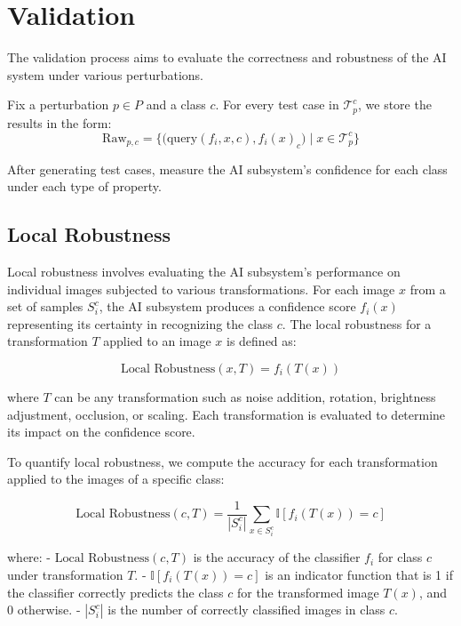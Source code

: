 \section{Validation}

The validation process aims to evaluate the correctness and robustness of the AI system under various perturbations.

Fix a perturbation \( p \in P \) and a class \( c \). For every test case in \( \mathcal{T}_p^c \), we store the results in the form:
\[ \text{Raw}_{p, c} = \Big\{\big(\text{query}(f_i, x, c), f_i(x)_c\big) \mid x \in \mathcal{T}_p^c \Big\} \]

After generating test cases, measure the AI subsystem's confidence for each class under each type of property.

\subsection{Local Robustness}

Local robustness involves evaluating the AI subsystem's performance on individual images subjected to various transformations. For each image \( x \) from a set of samples \( S_i^c \), the AI subsystem produces a confidence score \( f_i(x) \) representing its certainty in recognizing the class \( c \). The local robustness for a transformation \( T \) applied to an image \( x \) is defined as:

\[ \text{Local Robustness}(x, T) = f_i(T(x)) \]

where \( T \) can be any transformation such as noise addition, rotation, brightness adjustment, occlusion, or scaling. Each transformation is evaluated to determine its impact on the confidence score.

To quantify local robustness, we compute the accuracy for each transformation applied to the images of a specific class:

\[
\text{Local Robustness}(c, T) = \frac{1}{|S_i^c|} \sum_{x \in S_i^c} \mathbb{I}[f_i(T(x)) = c]
\]

where:
- \(\text{Local Robustness}(c, T)\) is the accuracy of the classifier \( f_i \) for class \( c \) under transformation \( T \).
- \( \mathbb{I}[f_i(T(x)) = c] \) is an indicator function that is 1 if the classifier correctly predicts the class \( c \) for the transformed image \( T(x) \), and 0 otherwise.
- \(|S_i^c|\) is the number of correctly classified images in class \( c \).

